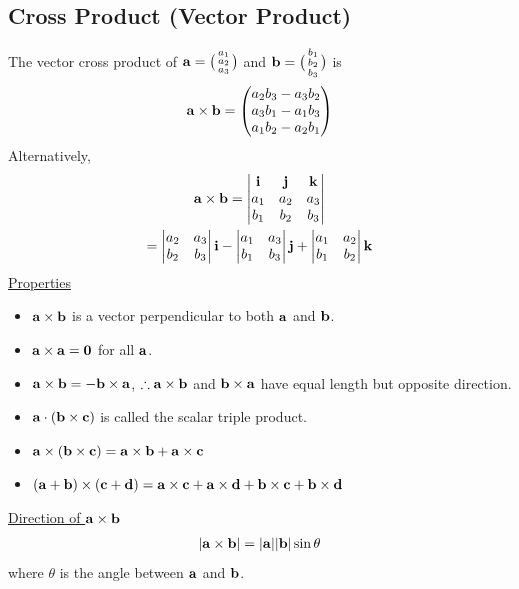\documentclass[10pt, a4paper, titlepage]{article}
\begin{document}
\begin{multicols*}{3}
	\subsection{Cross Product (Vector Product)}
	The vector cross product of $\vb{a}=\big(\begin{smallmatrix}a_1 \\a_2 \\a_3 \end{smallmatrix}\big)$
	and $\vb{b}=\big(\begin{smallmatrix}b_1 \\b_2 \\b_3 \end{smallmatrix}\big)$ is
	\begin{align}
		\vb{a}\times\vb{b}=\begin{pmatrix}a_2b_3-a_3b_2\\ a_3b_1-a_1b_3 \\a_1b_2-a_2b_1\end{pmatrix}
	\end{align}
	Alternatively,
	\begin{gather}
		\vb{a}\times\vb{b}=\begin{vmatrix}\vb{i} & \vb{j} & \vb{k} \\ a_1 & a_2 & a_3 \\ b_1 & b_2 & b_3\end{vmatrix}\\
		=\begin{vmatrix}a_2 & a_3 \\ b_2 & b_3\end{vmatrix}\vb{i}-\begin{vmatrix}a_1 & a_3 \\ b_1 & b_3\end{vmatrix}\vb{j}+\begin{vmatrix}a_1 & a_2 \\ b_1 & b_2\end{vmatrix}\vb{k}
	\end{gather}
	\underline{Properties}
	\begin{itemize}
		\item $\vb{a}\times\vb{b}$ is a vector perpendicular to both $\vb{a}$ and $\vb{b}$.
		\item $\vb{a}\times\vb{a}=\vb{0}$ for all $\vb{a}$.
		\item $\vb{a}\times\vb{b}=-\vb{b}\times\vb{a}$, $\therefore\vb{a}\times\vb{b}$ and $\vb{b}\times\vb{a}$ have equal length but opposite direction.
		\item $\vb{a}\cdot(\vb{b}\times\vb{c})$ is called the scalar triple product.
		\item $\vb{a}\times(\vb{b}\times\vb{c})=\vb{a}\times\vb{b}+\vb{a}\times\vb{c}$
		\item $(\vb{a}+\vb{b})\times(\vb{c}+\vb{d})\\=\vb{a}\times\vb{c}+\vb{a}\times\vb{d}+\vb{b}\times\vb{c}+\vb{b}\times\vb{d}$
	\end{itemize}
	\underline{Direction of $\vb{a}\times\vb{b}$}
	\begin{align}
		|\vb{a}\times\vb{b}|=|\vb{a}||\vb{b}|\sin{\theta}
	\end{align}
	where $\theta$ is the angle between $\vb{a}$ and $\vb{b}$.


\end{multicols*}
\end{document}
